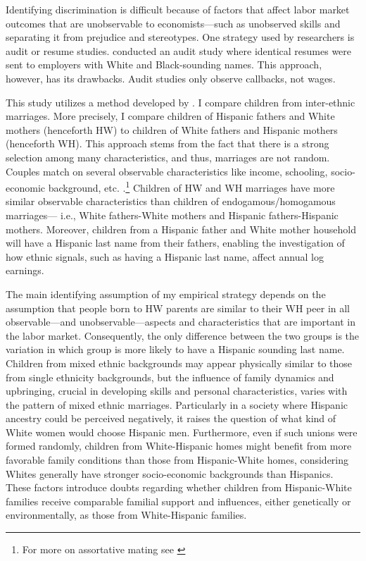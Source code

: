 Identifying discrimination is difficult because of factors that affect labor market outcomes that are unobservable to economists---such as unobserved skills and separating it from prejudice and stereotypes. One strategy used by researchers is audit or resume studies. \textcite{bertrand2004emily} conducted an audit study where identical resumes were sent to employers with White and Black-sounding names. This approach, however, has its drawbacks. Audit studies only observe callbacks, not wages. 

This study utilizes a method developed by \textcite{rubinstein2014pride}. I compare children from inter-ethnic marriages. More precisely, I compare children of Hispanic fathers and White mothers (henceforth HW) to children of White fathers and Hispanic mothers (henceforth  WH). This approach stems from the fact that there is a strong selection among many characteristics, and thus, marriages are not random. Couples match on several observable characteristics like income, schooling, socio-economic background, etc. \autocite{averettBetterWorseRelationship2008, averettEconomicRealityBeauty1996}.\footnote{For more on assortative mating see \autocite{beckerTheoryMarriagePart1973, beckerTheoryMarriagePart1974, beckerTreatiseFamily1993, browningCollectiveUnitaryModels2006, chiapporiFatterAttractionAnthropometric2012}} Children of HW and WH marriages have more similar observable characteristics than children of endogamous/homogamous marriages--- i.e., White fathers-White mothers and Hispanic fathers-Hispanic mothers. Moreover, children from a Hispanic father and White mother household will have a Hispanic last name from their fathers, enabling the investigation of how ethnic signals, such as having a Hispanic last name, affect annual log earnings.

The main identifying assumption of my empirical strategy depends on the assumption that people born to HW parents are similar to their WH peer in all observable---and unobservable---aspects and characteristics that are important in the labor market. Consequently, the only difference between the two groups is the variation in which group is more likely to have a Hispanic sounding last name. Children from mixed ethnic backgrounds may appear physically similar to those from single ethnicity backgrounds, but the influence of family dynamics and upbringing, crucial in developing skills and personal characteristics, varies with the pattern of mixed ethnic marriages. Particularly in a society where Hispanic ancestry could be perceived negatively, it raises the question of what kind of White women would choose Hispanic men. Furthermore, even if such unions were formed randomly, children from White-Hispanic homes might benefit from more favorable family conditions than those from Hispanic-White homes, considering Whites generally have stronger socio-economic backgrounds than Hispanics. These factors introduce doubts regarding whether children from Hispanic-White families receive comparable familial support and influences, either genetically or environmentally, as those from White-Hispanic families.

